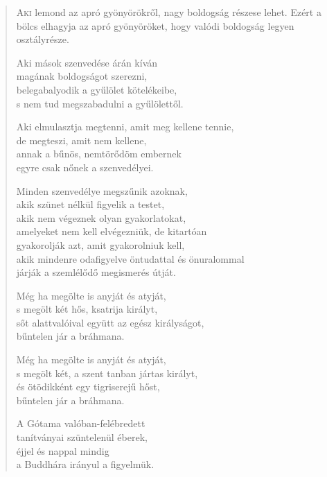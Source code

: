 
\begin{verse}

{\par%
\lettrine[slope=0.5em]{A}{ki} {\LettrineTextFont lemond az apró gyönyörökről,}\newline
nagy boldogság részese lehet. Ezért a bölcs\newline
elhagyja az apró gyönyöröket,\verselinebreak
hogy valódi boldogság legyen osztályrésze.
\par}

 Aki mások szenvedése árán kíván\\
magának boldogságot szerezni,\\
belegabalyodik a gyűlölet kötelékeibe,\\
s nem tud megszabadulni a gyűlölettől.

 Aki elmulasztja megtenni, amit meg kellene tennie,\\
de megteszi, amit nem kellene,\\
annak a bűnös, nemtörődöm embernek\\
egyre csak nőnek a szenvedélyei.

 Minden szenvedélye megszűnik azoknak,\\
akik szünet nélkül figyelik a testet,\\
akik nem végeznek olyan gyakorlatokat,\\
amelyeket nem kell elvégezniük, de kitartóan\\
gyakorolják azt, amit gyakorolniuk kell,\\
akik mindenre odafigyelve öntudattal és önuralommal\\
járják a szemlélődő megismerés útját.

 Még ha megölte is anyját és atyját,\\
s megölt két hős, ksatrija királyt,\\
sőt alattvalóival együtt az egész királyságot,\\
bűntelen jár a bráhmana.

 Még ha megölte is anyját és atyját,\\
s megölt két, a szent tanban jártas királyt,\\
és ötödikként egy tigriserejű hőst,\\
bűntelen jár a bráhmana.

 A Gótama valóban-felébredett\\
tanítványai szüntelenül éberek,\\
éjjel és nappal mindig\\
a Buddhára irányul a figyelmük.


\end{verse}
